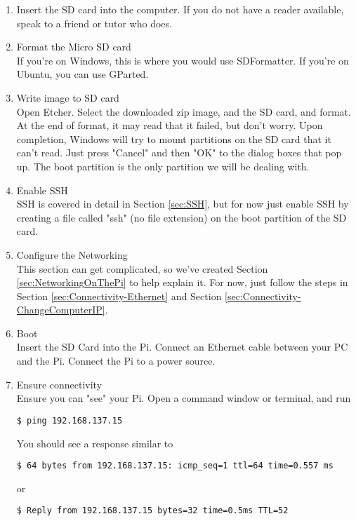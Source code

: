 \begin{enumerate}
    \item Insert the SD card into the computer. If you do not have a reader available, speak to a friend or tutor who does.
    \item Format the Micro SD card\\
        If you're on Windows, this is where you would use SDFormatter. If you're on     Ubuntu, you can use GParted.
    \item Write image to SD card\\
        Open Etcher. Select the downloaded zip image, and the SD card, and format. At the end of format, it may read that it failed,  but don't worry. Upon completion, Windows will try to mount partitions on the SD card that it can't read. Just press "Cancel" and then "OK" to the dialog boxes that pop up. The boot partition is the only partition we will be dealing with.
    \item Enable SSH\\
        SSH is covered in detail in Section \ref{sec:SSH}, but for now just enable SSH by creating a file called "ssh" (no file extension) on the boot partition of the SD card.
    \item Configure the Networking\\
        This section can get complicated, so we've created Section \ref{sec:NetworkingOnThePi} to help explain it. For now, just follow the steps in Section \ref{sec:Connectivity-Ethernet} and Section \ref{sec:Connectivity-ChangeComputerIP}.
    \item Boot\\
        Insert the SD Card into the Pi. Connect an Ethernet cable between your PC and the Pi. Connect the Pi to a power source.
    \item Ensure connectivity\\
        Ensure you can "see" your Pi. Open a command window or terminal, and run
        \begin{lstlisting}[gobble=8]
        $ ping 192.168.137.15
        \end{lstlisting}
        You should see a response similar to
        \begin{lstlisting}[gobble=8]
        $ 64 bytes from 192.168.137.15: icmp_seq=1 ttl=64 time=0.557 ms
        \end{lstlisting}
        or
         \begin{lstlisting}[gobble=8]
        $ Reply from 192.168.137.15 bytes=32 time=0.5ms TTL=52
        \end{lstlisting}

\end{enumerate}
